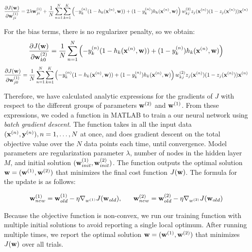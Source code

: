 \begin{equation}
\frac{\partial J(\boldsymbol{\mathbf{w}})}{\partial \boldsymbol{\mathbf{w}}^{(1)}_{ji}} =  2 \lambda \boldsymbol{\mathbf{w}}^{(1)}_{ji}  + \frac{1}{N}\sum_{n=1}^{N} \sum_{k=1}^{K} \left(-y_k^{(n)}(1 - h_k(\boldsymbol{\mathbf{x}}^{(n)},\boldsymbol{\mathbf{w}})) + (1-y_k^{(n)})h_k(\boldsymbol{\mathbf{x}}^{(n)},\boldsymbol{\mathbf{w}}) \right)w_{kj}^{(2)} z_j(\boldsymbol{\mathbf{x}}^{(n)})(1-z_j(\boldsymbol{\mathbf{x}}^{(n)})) \boldsymbol{\mathbf{x}}^{(n)}
\end{equation}

For the bias terms, there is no regularizer penalty, so we obtain:
\begin{equation}
\frac{\partial J(\boldsymbol{\mathbf{w}})}{\partial \boldsymbol{\mathbf{w}}^{(2)}_{k0}} = \frac{1}{N}\sum_{n=1}^{N} \left(-y_k^{(n)}(1 - h_k(\boldsymbol{\mathbf{x}}^{(n)},\boldsymbol{\mathbf{w}})) + (1-y_k^{(n)})h_k(\boldsymbol{\mathbf{x}}^{(n)},\boldsymbol{\mathbf{w}}) \right)
\end{equation}
\begin{equation}
\frac{\partial J(\boldsymbol{\mathbf{w}})}{\partial \boldsymbol{\mathbf{w}}^{(1)}_{j0}} =  \frac{1}{N} \sum_{n=1}^{N} \sum_{k=1}^{K} \left(-y_k^{(n)}(1 - h_k(\boldsymbol{\mathbf{x}}^{(n)},\boldsymbol{\mathbf{w}})) + (1-y_k^{(n)})h_k(\boldsymbol{\mathbf{x}}^{(n)},\boldsymbol{\mathbf{w}}) \right)w_{kj}^{(2)} z_j(\boldsymbol{\mathbf{x}}^{(n)})(1-z_j(\boldsymbol{\mathbf{x}}^{(n)})) \boldsymbol{\mathbf{x}}^{(n)}
\end{equation}

Therefore, we have calculated analytic expressions for the gradients of $J$ with respect to the different groups of parameters $\boldsymbol{\mathbf{w}}^{(2)}$ and $\boldsymbol{\mathbf{w}}^{(1)}$.  From these expressions, we coded a function in MATLAB to train a our neural network using \textit{batch gradient descent}. The function takes in all the input data $(\boldsymbol{\mathbf{x}}^{(n)},\boldsymbol{\mathbf{y}}^{(n)}), n = 1, \ldots, N$ at once, and does gradient descent on the total objective value over the $N$ data points each time, until convergence. Model parameters are regularization parameter $\lambda$, number of nodes in the hidden layer $M$, and initial solution $(\boldsymbol{\mathbf{w}}^{(1)}_{init}, \boldsymbol{\mathbf{w}}^{(2)}_{init})$. The function outputs the optimal solution $\boldsymbol{\mathbf{w}} = (\boldsymbol{\mathbf{w}}^{(1)}, \boldsymbol{\mathbf{w}}^{(2)})$ that minimizes the final cost function $J(\boldsymbol{\mathbf{w}})$. The formula for the update is as follows:

\begin{equation}
\boldsymbol{\mathbf{w}}^{(1)}_{new} = \boldsymbol{\mathbf{w}}^{(1)}_{old} - \eta \nabla_{w^{(1)}}J(\boldsymbol{\mathbf{w}}_{old}),~~~~~~\\
\boldsymbol{\mathbf{w}}^{(2)}_{new} = \boldsymbol{\mathbf{w}}^{(2)}_{old} - \eta \nabla_{w^{(2)}}J(\boldsymbol{\mathbf{w}}_{old})
\end{equation}


Because the objective function is non-convex, we run our training function with multiple initial solutions to avoid reporting a single local optimum.  After running multiple times, we report the optimal solution $\boldsymbol{\mathbf{w}} = (\boldsymbol{\mathbf{w}}^{(1)}, \boldsymbol{\mathbf{w}}^{(2)})$ that minimizes $J(\boldsymbol{\mathbf{w}})$ over all trials. %

